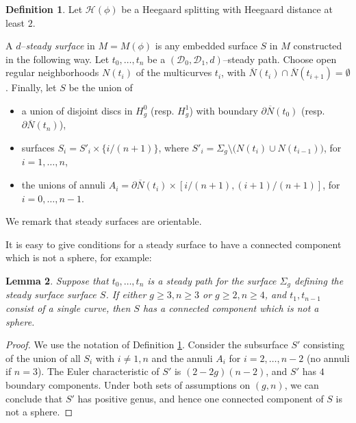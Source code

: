 \documentclass[11pt, oneside]{amsart}
\newtheorem{lemma}{Lemma}[section]
\theoremstyle{definition}
\newtheorem{defn}[lemma]{Definition}
\theoremstyle{definition}
\newcommand{\calH} {\ensuremath {\mathcal{H}}}
\newcommand{\calD} {\ensuremath {\mathcal{D}}}
\begin{document}
\begin{defn}\label{defn:steadysurface}
 Let $\calH(\phi)$ be a Heegaard splitting with Heegaard distance at least $2$.
 
 A $d$--\emph{steady surface} in $M=M(\phi)$ is any embedded surface $S$ in $M$ constructed in the following way. Let $t_0,\dots,t_n$ be a $(\calD_0,\calD_1,d)$--steady path.
 Choose open regular neighborhoods $N(t_i)$ of the multicurves $t_i$, with $\overline N(t_i)\cap \overline N(t_{i+1})=\emptyset$. Finally, let $S$ be the union of
 \begin{itemize}
  \item a union of disjoint discs in $H_g^0$ (resp. $H_g^1$) with boundary $\partial \overline N(t_0)$ (resp. $\partial \overline N(t_n)$),
  \item surfaces $S_i=S'_i\times\{i/(n+1)\}$, where $S'_i=\Sigma_g\setminus \Big(N(t_i)\cup N(t_{i-1})\Big)$, for $i=1,\dots,n$,
  \item the unions of annuli $A_i=\partial \overline N(t_i)\times [i/(n+1),(i+1)/(n+1)]$, for $i=0,\dots,n-1$.
 \end{itemize}
 
\end{defn}

We remark that steady surfaces are orientable.

It is easy to give conditions for a steady surface to have a connected component which is not a sphere, for example:

\begin{lemma}\label{lem:Euler}
 Suppose that $t_0,\dots,t_n$ is a steady path for the surface $\Sigma_g$ defining the steady surface surface $S$. If either $g\geq 3, n\geq3$ or $g\geq 2,n\geq 4$, and $t_1,t_{n-1}$ consist of a single curve, then $S$ has a connected component which is not a sphere. 
\end{lemma}

\begin{proof}
 We use the notation of Definition \ref{defn:steadysurface}. Consider the subsurface $S'$ consisting of the union of all $S_i$ with $i\neq 1,n$ and the annuli $A_i$ for $i=2,\dots,n-2$ (no annuli if $n=3$). The Euler characteristic of $S'$ is $ (2-2g)(n-2)$, and $S'$ has $4$ boundary components. Under both sets of assumptions on $(g,n)$, we can conclude that $S'$ has positive genus, and hence one connected component of $S$ is not a sphere.
\end{proof}
\end{document}
